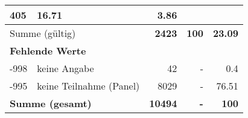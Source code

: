 \begin{longtable}{lXrrr}
       \num{405} &
       \num[round-mode=places,round-precision=2]{16,71} &
         \num[round-mode=places,round-precision=2]{3,86} \\
     \midrule
     \multicolumn{2}{l}{Summe (gültig)} &
       \textbf{\num{2423}} &
     \textbf{100} &
       \textbf{\num[round-mode=places,round-precision=2]{23,09}} \\
     \multicolumn{5}{l}{\textbf{Fehlende Werte}}\\
       -998 &
       keine Angabe &
         \num{42} &
        - &
         \num[round-mode=places,round-precision=2]{0,4} \\
       -995 &
       keine Teilnahme (Panel) &
         \num{8029} &
        - &
         \num[round-mode=places,round-precision=2]{76,51} \\
     \midrule
     \multicolumn{2}{l}{\textbf{Summe (gesamt)}} &
          \textbf{\num{10494}} &
        \textbf{-} &
        \textbf{100} \\
     \bottomrule
     \end{longtable}
     
